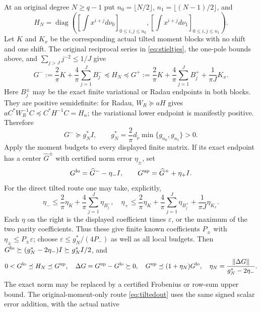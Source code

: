 \documentclass[11pt]{article}
\newcommand{\diag}{\operatorname{diag}}
\newcommand{\norm}[1]{\left\lVert#1\right\rVert}
\begin{document}
At an original degree $N\ge q-1$ put
$n_0=\lfloor N/2\rfloor$, $n_1=\lfloor(N-1)/2\rfloor$, and
\[
 H_N=\diag\left([\int x^{i+j}d\nu_0]_{0\le i,j\le n_0},
                [\int x^{i+j}d\nu_1]_{0\le i,j\le n_1}\right).
\]
Let $K$ and $K_x$ be the corresponding actual tilted moment
blocks with no shift and one shift. The original reciprocal series
in \eqref{eq:stieltjes}, the one-pole bounds above, and
$\sum_{j>J}j^{-2}\le1/J$ give
\begin{equation}\label{eq:Gexact}
 G^-:=\frac2\pi K+\frac4\pi\sum_{j=1}^JB_j^-
 \preceq H_N\preceq
 G^+:=\frac2\pi K+\frac4\pi\sum_{j=1}^JB_j^+
                        +\frac1{\pi J}K_x.
\end{equation}
Here $B_j^\pm$ may be the exact finite variational or Radau
endpoints in both blocks. They are positive semidefinite: for
Radau, $W_R\succeq aH$ gives
$aC^*W_R^{-1}C\preceq C^*H^{-1}C=H_n$; the variational
lower endpoint is manifestly positive. Therefore
\begin{equation}\label{eq:gsource}
 G^-\succeq g_N^*I,\qquad
 g_N^*=\frac2\pi d_{\widetilde\nu}
                         \min\{g_{n_0},g_{n_1}\}>0.
\end{equation}
Apply the moment budgets to every displayed finite matrix. If
its exact endpoint has a center $\widehat G^\pm$ with certified
norm error $\eta_\pm$, set
\begin{equation}\label{eq:Gout}
 G^{\rm lo}=\widehat G^--\eta_-I,\qquad
 G^{\rm up}=\widehat G^++\eta_+I.
\end{equation}
For the direct tilted route one may take, explicitly,
\[
 \eta_-\le\frac2\pi\eta_K+\frac4\pi\sum_{j=1}^J\eta_{B_j^-},
 \quad
 \eta_+\le\frac2\pi\eta_K+\frac4\pi\sum_{j=1}^J\eta_{B_j^+}
                         +\frac1{\pi J}\eta_{K_x}.
\]
Each $\eta$ on the right is the displayed coefficient times
$\varepsilon$, or the maximum of the two parity coefficients.
Thus these give finite known coefficients $P_\pm$ with
$\eta_\pm\le P_\pm\varepsilon$; choose
$\varepsilon\le g_N^*/(4P_-)$ as well as all local budgets.
Then $G^{\rm lo}\succeq(g_N^*-2\eta_-)I\succeq g_N^*I/2$,
and
\begin{equation}\label{eq:sourcecert}
 0<G^{\rm lo}\preceq H_N\preceq G^{\rm up},\quad
 \Delta G=G^{\rm up}-G^{\rm lo}\succeq0,\quad
 G^{\rm up}\preceq(1+\eta_N)G^{\rm lo},\quad
 \eta_N=\frac{\norm{\Delta G}}{g_N^*-2\eta_-}.
\end{equation}
The exact norm may be replaced by a certified Frobenius or row-sum
upper bound. The original-moment-only route \eqref{eq:tiltedout}
uses the same signed scalar error addition, with the actual native
\end{document}
